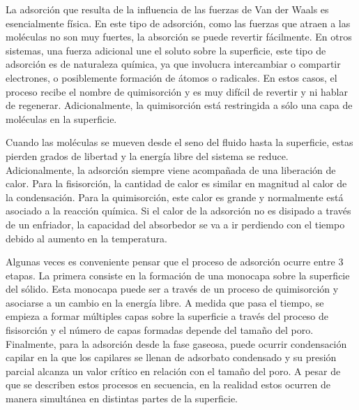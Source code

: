 \documentclass[11pt]{book}
\begin{document}
La adsorción que resulta de la influencia de las fuerzas de Van der Waals es esencialmente física. En este tipo de adsorción, como las fuerzas que atraen a las moléculas no son muy fuertes, la absorción se puede revertir fácilmente. En otros sistemas, una fuerza adicional une el soluto sobre la superficie, este tipo de adsorción es de naturaleza química, ya que involucra intercambiar o compartir electrones, o posiblemente formación de átomos o radicales. En estos casos, el proceso recibe el nombre de quimisorción y es muy difícil de revertir y ni hablar de regenerar. Adicionalmente, la quimisorción está restringida a sólo una capa de moléculas en la superficie.

Cuando las moléculas se mueven desde el seno del fluido hasta la superficie, estas pierden grados de libertad y la energía libre del sistema se reduce. Adicionalmente, la adsorción siempre viene acompañada de una liberación de calor. Para la fisisorción, la cantidad de calor es similar en magnitud al calor de la condensación. Para la quimisorción, este calor es grande y normalmente está asociado a la reacción química. Si el calor de la adsorción no es disipado a través de un enfriador, la capacidad del absorbedor se va a ir perdiendo con el tiempo debido al aumento en la temperatura.

Algunas veces es conveniente pensar que el proceso de adsorción ocurre entre 3 etapas. La primera consiste en la formación de una monocapa sobre la superficie del sólido. Esta monocapa puede ser a través de un proceso de quimisorción y asociarse a un cambio en la energía libre. A medida que pasa el tiempo, se empieza a formar múltiples capas sobre la superficie a través del proceso de fisisorción y el número de capas formadas depende del tamaño del poro. Finalmente, para la adsorción desde la fase gaseosa, puede ocurrir condensación capilar en la que los capilares se llenan de adsorbato condensado y su presión parcial alcanza un valor crítico en relación con el tamaño del poro. 
A pesar de que se describen estos procesos en secuencia, en la realidad estos ocurren de manera simultánea en distintas partes de la superficie. 
\end{document}
